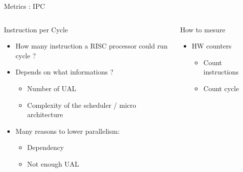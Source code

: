 \begin{Frame}{Metrics : IPC}
\begin{columns}[t]
\begin{column}{\BW}
\begin{block}{Instruction per Cycle}
\begin{itemize}
\item How many instruction a RISC processor could run cycle ?
\item Depends on what informations ?
  \begin{itemize}
  \item Number of UAL
  \item Complexity of the scheduler / micro architecture
  \end{itemize}
\item Many reasons to lower parallelism:
  \begin{itemize}
  \item Dependency
  \item Not enough UAL
  \end{itemize}
\end{itemize}

\end{block}

\end{column}
\begin{column}{\BW}
\begin{block}{How to mesure}
  \begin{itemize}
  \item HW counters
    \begin{itemize}
    \item Count instructions
    \item Count cycle
    \end{itemize}
  \end{itemize}
\end{block}

\end{column}

\end{columns}

\end{Frame}

